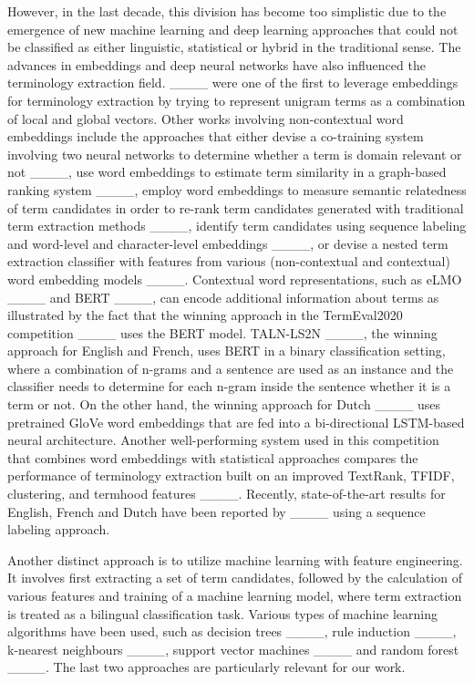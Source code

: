 However, in the last decade, this division has become too simplistic due to the emergence of new machine learning and deep learning approaches that could not be classified as either linguistic, statistical or hybrid in the traditional sense. The advances in embeddings and deep neural networks have also influenced the terminology extraction field. ____ were one of the first to leverage embeddings for terminology extraction by trying to represent unigram terms as a combination of local and global vectors. Other works involving non-contextual word embeddings include the approaches that either devise a co-training system involving two neural networks to determine whether a term is domain relevant or not ____, use word embeddings to estimate term similarity in a graph-based ranking system ____,  employ word embeddings to measure semantic relatedness of term candidates in order to re-rank term candidates generated with traditional term extraction methods ____,  identify term candidates using sequence labeling and word-level and character-level embeddings ____, or devise a nested term extraction classifier with features from various (non-contextual and contextual) word embedding models ____. Contextual word representations, such as eLMO ____ and BERT ____, can encode additional information about terms as illustrated by the fact that the winning approach in the TermEval2020 competition ____ uses the BERT model. TALN-LS2N ____, the winning approach for English and French, uses BERT in a binary classification setting, where a combination of n-grams and a sentence are used as an instance and the classifier needs to determine for each n-gram inside the sentence whether it is a term or not. On the other hand, the winning approach for Dutch ____ uses pretrained GloVe word embeddings that are fed into a bi-directional LSTM-based neural architecture. Another well-performing system used in this competition that combines word embeddings with statistical approaches compares the performance of terminology extraction built on an improved TextRank, TFIDF, clustering, and termhood features ____. Recently, state-of-the-art results for English, French and Dutch have been reported by ____ using a sequence labeling approach.

Another distinct approach is to utilize machine learning with feature engineering. It involves first extracting a set of term candidates, followed by the calculation of various features and training of a machine learning model, where term extraction is treated as a bilingual classification task. Various types of machine learning algorithms have been used, such as decision trees ____, rule induction ____, k-nearest neighbours ____, support vector machines ____ and random forest ____. The last two approaches are particularly relevant for our work. 

